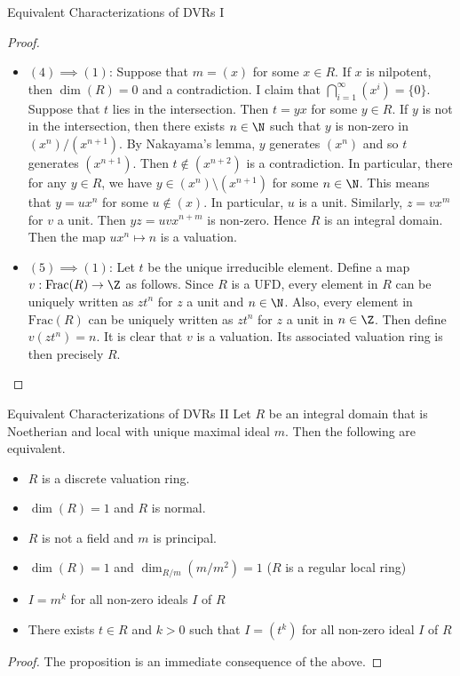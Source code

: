 \documentclass[a4paper]{article}
\begin{document}
\begin{prp}{Equivalent Characterizations of DVRs I}{}
\begin{proof}
\begin{itemize}
Thus $m$ is a PID. 
\item $(4)\implies(1)$: Suppose that $m=(x)$ for some $x\in R$. If $x$ is nilpotent, then $\dim(R)=0$ and a contradiction. I claim that $\bigcap_{i=1}^\infty(x^i)=\{0\}$. Suppose that $t$ lies in the intersection. Then $t=yx$ for some $y\in R$. If $y$ is not in the intersection, then there exists $n\in\N$ such that $y$ is non-zero in $(x^n)/(x^{n+1})$. By Nakayama's lemma, $y$ generates $(x^n)$ and so $t$ generates $(x^{n+1})$. Then $t\notin(x^{n+2})$ is a contradiction. In particular, there for any $y\in R$, we have $y\in(x^n)\setminus(x^{n+1})$ for some $n\in\N$. This means that $y=ux^n$ for some $u\notin(x)$. In particular, $u$ is a unit. Similarly, $z=vx^m$ for $v$ a unit. Then $yz=uvx^{n+m}$ is non-zero. Hence $R$ is an integral domain. Then the map $ux^n\mapsto n$ is a valuation. 
\item $(5)\implies(1)$: Let $t$ be the unique irreducible element. Define a map $v:\text{Frac}(R)\to\Z$ as follows. Since $R$ is a UFD, every element in $R$ can be uniquely written as $zt^n$ for $z$ a unit and $n\in\N$. Also, every element in $\text{Frac}(R)$ can be uniquely written as $zt^n$ for $z$ a unit in $n\in\Z$. Then define $v(zt^n)=n$. It is clear that $v$ is a valuation. Its associated valuation ring is then precisely $R$. 
\end{itemize}
\end{proof}
\end{prp}

\begin{prp}{Equivalent Characterizations of DVRs II}{} Let $R$ be an integral domain that is Noetherian and local with unique maximal ideal $m$. Then the following are equivalent. 
\begin{itemize}
\item $R$ is a discrete valuation ring. 
\item $\dim(R)=1$ and $R$ is normal. 
\item $R$ is not a field and $m$ is principal. 
\item $\dim(R)=1$ and $\dim_{R/m}(m/m^2)=1$ ($R$ is a regular local ring)
\item $I=m^k$ for all non-zero ideals $I$ of $R$
\item There exists $t\in R$ and $k>0$ such that $I=(t^k)$ for all non-zero ideal $I$ of $R$
\end{itemize} 
\begin{proof}
The proposition is an immediate consequence of the above. 
\end{proof}
\end{prp}
\end{document}
